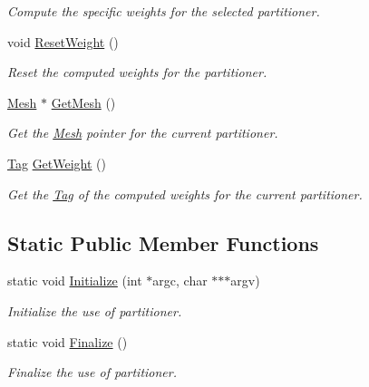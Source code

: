 \begin{DoxyCompactItemize}
\begin{DoxyCompactList}\small\item\em Compute the specific weights for the selected partitioner. \end{DoxyCompactList}\item 
\hypertarget{classINMOST_1_1Partitioner_ae3a9cc78be5b685316e1eabb2cd00a79}{void \hyperlink{classINMOST_1_1Partitioner_ae3a9cc78be5b685316e1eabb2cd00a79}{Reset\-Weight} ()}\label{classINMOST_1_1Partitioner_ae3a9cc78be5b685316e1eabb2cd00a79}

\begin{DoxyCompactList}\small\item\em Reset the computed weights for the partitioner. \end{DoxyCompactList}\item 
\hypertarget{classINMOST_1_1Partitioner_a372a7b3650c770c8adc8769dba8793d9}{\hyperlink{classINMOST_1_1Mesh}{Mesh} $\ast$ \hyperlink{classINMOST_1_1Partitioner_a372a7b3650c770c8adc8769dba8793d9}{Get\-Mesh} ()}\label{classINMOST_1_1Partitioner_a372a7b3650c770c8adc8769dba8793d9}

\begin{DoxyCompactList}\small\item\em Get the \hyperlink{classINMOST_1_1Mesh}{Mesh} pointer for the current partitioner. \end{DoxyCompactList}\item 
\hypertarget{classINMOST_1_1Partitioner_a7ad2c7e955369ae57b40cd9433427c5b}{\hyperlink{classINMOST_1_1Tag}{Tag} \hyperlink{classINMOST_1_1Partitioner_a7ad2c7e955369ae57b40cd9433427c5b}{Get\-Weight} ()}\label{classINMOST_1_1Partitioner_a7ad2c7e955369ae57b40cd9433427c5b}

\begin{DoxyCompactList}\small\item\em Get the \hyperlink{classINMOST_1_1Tag}{Tag} of the computed weights for the current partitioner. \end{DoxyCompactList}\end{DoxyCompactItemize}
\subsection*{Static Public Member Functions}
\begin{DoxyCompactItemize}
\item 
static void \hyperlink{classINMOST_1_1Partitioner_a6499e92ff7f475573e1bc4b157b09573}{Initialize} (int $\ast$argc, char $\ast$$\ast$$\ast$argv)
\begin{DoxyCompactList}\small\item\em Initialize the use of partitioner. \end{DoxyCompactList}\item 
static void \hyperlink{classINMOST_1_1Partitioner_af9ff5247ee5d6dfa28e0fba266a1cb03}{Finalize} ()
\begin{DoxyCompactList}\small\item\em Finalize the use of partitioner. \end{DoxyCompactList}\end{DoxyCompactItemize}


